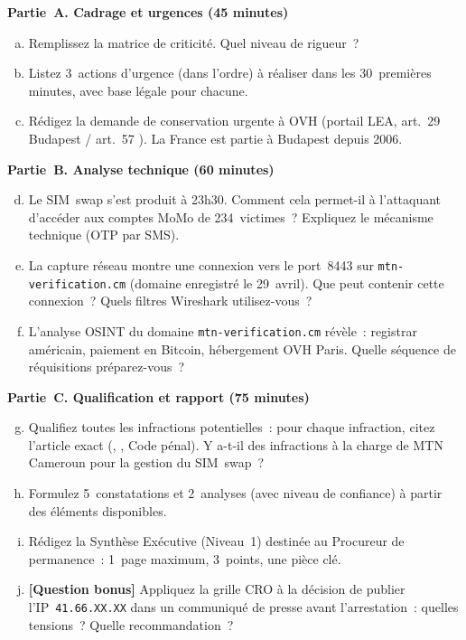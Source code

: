 \begin{boxexo}[title={\ding{45}\quad Examen. Opération DIBAMBA (3 heures)}]
\textbf{Partie~A. Cadrage et urgences (45 minutes)}

\begin{enumerate}[(a)]
    \item Remplissez la matrice de criticité. Quel niveau de rigueur~?
    \item Listez 3~actions d'urgence (dans l'ordre) à réaliser
          dans les 30~premières minutes, avec base légale pour chacune.
    \item Rédigez la demande de conservation urgente à OVH (portail
          LEA, art.~29 Budapest / art.~57 ).
          La France est partie à Budapest depuis 2006.
\end{enumerate}

\textbf{Partie~B. Analyse technique (60 minutes)}

\begin{enumerate}[(a)]
    \setcounter{enumi}{3}
    \item Le SIM~swap s'est produit à 23h30. Comment cela permet-il
          à l'attaquant d'accéder aux comptes MoMo de 234~victimes~?
          Expliquez le mécanisme technique (OTP par SMS).
    \item La capture réseau montre une connexion vers le port~8443
          sur \texttt{mtn-verification.cm} (domaine enregistré
          le 29~avril). Que peut contenir cette connexion~?
          Quels filtres Wireshark utilisez-vous~?
    \item L'analyse OSINT du domaine \texttt{mtn-verification.cm}
          révèle~: registrar américain, paiement en Bitcoin,
          hébergement OVH Paris. Quelle séquence de réquisitions
          préparez-vous~?
\end{enumerate}

\textbf{Partie~C. Qualification et rapport (75 minutes)}

\begin{enumerate}[(a)]
    \setcounter{enumi}{6}
    \item Qualifiez toutes les infractions potentielles~: pour chaque
          infraction, citez l'article exact (,
          , Code pénal). Y a-t-il des infractions
          à la charge de MTN Cameroun pour la gestion du SIM~swap~?
    \item Formulez 5~constatations et 2~analyses (avec niveau de
          confiance) à partir des éléments disponibles.
    \item Rédigez la Synthèse Exécutive (Niveau~1) destinée
          au Procureur de permanence~: 1~page maximum,
          3~points, une pièce clé.
    \item \textbf{[Question bonus]} Appliquez la grille CRO à la
          décision de publier l'IP~\texttt{41.66.XX.XX} dans un
          communiqué de presse avant l'arrestation~: quelles
          tensions~? Quelle recommandation~?
\end{enumerate}
\end{boxexo}

